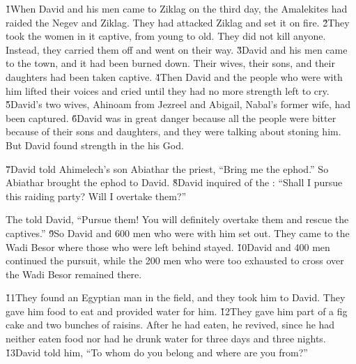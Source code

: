 \v{1}When David and his men came to Ziklag on the third day, the Amalekites had raided the Negev and Ziklag. They had attacked Ziklag and set it on fire. \v{2}They took the women in it captive, from young to old. They did not kill anyone. Instead, they carried them off and went on their way. \v{3}David and his men came to the town, and it had been burned down. Their wives, their sons, and their daughters had been taken captive. \v{4}Then David and the people who were with him lifted their voices and cried until they had no more strength left to cry. \v{5}David's two wives, Ahinoam from Jezreel and Abigail, Nabal's former wife, had been captured. \v{6}David was in great danger because all the people were bitter because of their sons and daughters, and they were talking about stoning him. But David found strength in the  his God.

\v{7}David told Ahimelech's son Abiathar the priest, ``Bring me the ephod.'' So Abiathar brought the ephod to David. \v{8}David inquired of the : ``Shall I pursue this raiding party? Will I overtake them?''

The  told David, ``Pursue them! You will definitely overtake them and rescue the captives.'' \v{9}So David and 600 men who were with him set out. They came to the Wadi Besor where those who were left behind stayed. \v{10}David and 400 men continued the pursuit, while the 200 men who were too exhausted to cross over the Wadi Besor remained there.

\v{11}They found an Egyptian man in the field, and they took him to David. They gave him food to eat and provided water for him. \v{12}They gave him part of a fig cake and two bunches of raisins. After he had eaten, he revived, since he had neither eaten food nor had he drunk water for three days and three nights. \v{13}David told him, ``To whom do you belong and where are you from?''

